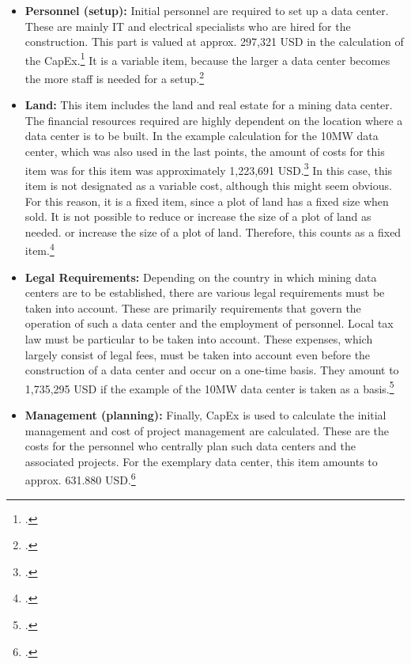 \begin{itemize}
    and the number of heavy-duty racks increase with the number of mining hardware, this part is considered a variable item.
    portion is considered a variable item. For a 10MW data center, this portion is approximately 284,850
    USD.\footcite[Cf.][]{appendix:capex}
    \item \textbf{Personnel (setup): }Initial personnel are required to set up a data center. These are
    mainly IT and electrical specialists who are hired for the construction. This part is valued at approx.
    297,321 \ac{USD} in the calculation of the \ac{CapEx}.\footcite[Cf.][]{appendix:capex} It is a variable
    item, because the larger a data center becomes the more staff is needed for a setup.\footcite[Cf.][]{appendix:capex}
    \item \textbf{Land: }This item includes the land and real estate for a mining data center. The
    financial resources required are highly dependent on the location where a data center is to be built. In the
    example calculation for the 10MW data center, which was also used in the last points, the amount of costs for this item was
    for this item was approximately 1,223,691 \ac{USD}.\footcite[Cf.][]{appendix:capex} In this case, this item is not
    designated as a variable cost, although this might seem obvious. For this reason, it is a fixed item,
    since a plot of land has a fixed size when sold. It is not possible to reduce or increase the size of a plot of land as needed.
    or increase the size of a plot of land. Therefore, this counts as a fixed item.\footcite[Cf.][]{appendix:capex}
    \item \textbf{Legal Requirements: }Depending on the country in which mining data centers are to be established, there are
    various legal requirements must be taken into account. These are primarily requirements that govern the
    operation of such a data center and the employment of personnel. Local tax law must be
    particular to be taken into account. These expenses, which largely consist of legal fees, must be taken into account even before the
    construction of a data center and occur on a one-time basis. They amount to 1,735,295 \ac{USD} if
    the example of the 10MW data center is taken as a basis.\footcite[Cf.][]{appendix:capex}
    \item \textbf{Management (planning): }Finally, \ac{CapEx} is used to calculate the initial management and cost of
    project management are calculated. These are the costs for the personnel who centrally plan such data centers and the
    associated projects. For the exemplary data center, this item amounts to approx.
    631.880 USD.\footcite[Cf.][]{appendix:capex}
\end{itemize}

